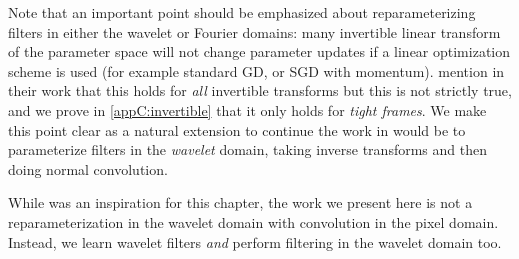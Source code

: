 Note that an important point should be emphasized about reparameterizing filters
in either the wavelet or Fourier domains: many invertible linear
transform of the parameter space will not change parameter updates if a linear
optimization scheme is used (for example standard GD, or SGD with momentum). 
\citeauthor{rippel_spectral_2015}
mention in their work that this holds for \emph{all} invertible
transforms but this is not strictly true, and we prove in
\autoref{appC:invertible} that it only holds for \emph{tight frames}. 
We make this point clear as a natural extension to continue the work
in \cite{rippel_spectral_2015} would be to parameterize filters in the \emph{wavelet} domain,
taking inverse transforms and then doing normal convolution. 

While \cite{rippel_spectral_2015} was an inspiration for this chapter, the work we
present here is not a reparameterization in the wavelet domain with convolution
in the pixel domain. Instead, we learn wavelet filters \emph{and} perform filtering in the wavelet domain too.


